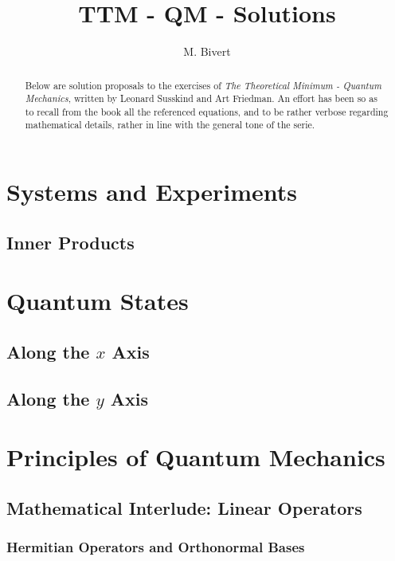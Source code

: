\documentclass[a4paper]{article}
\author{M. Bivert}
\title{TTM - QM - Solutions}
\begin{document}
\maketitle
\begin{abstract}
Below are solution proposals to the exercises of
\textit{The Theoretical Minimum - Quantum Mechanics}, written
by Leonard Susskind and Art Friedman. An effort has been
so as to recall from the book all the referenced equations,
and to be rather verbose regarding mathematical details, rather
in line with the general tone of the serie.
\end{abstract}

\tableofcontents

\section{Systems and Experiments}
\subsection{Inner Products}


\section{Quantum States}
\subsection{Along the $x$ Axis}

\subsection{Along the $y$ Axis}


\section{Principles of Quantum Mechanics}
\subsection{Mathematical Interlude: Linear Operators}
\subsubsection{Hermitian Operators and Orthonormal Bases}
%
\end{document}
